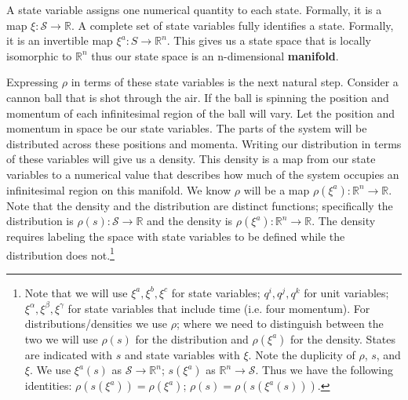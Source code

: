 \documentclass{article}
\begin{document}
\begin{defn}
	A state variable assigns one numerical quantity to each state. Formally, it is a map $\xi : \mathcal{S} \to \mathbb{R}$. A complete set of state variables fully identifies a state. Formally, it is an invertible  map $\xi^a : S \rightarrow \mathbb{R}^n $. This gives us a state space that is locally isomorphic to $\mathbb{R}^n$ thus our state space is an n-dimensional \textbf{manifold}.
\end{defn}

		
	Expressing $\rho$ in terms of these state variables is the next natural step. Consider a cannon ball that is shot through the air. If the ball is spinning the position and momentum of each infinitesimal region of the ball will vary. Let the position and momentum in space be our state variables. The parts of the system will be distributed across these positions and momenta. Writing our distribution in terms of these variables will give us a density. This density is a map from our state variables to a numerical value that describes how much of the system occupies an infinitesimal region on this manifold. We know $\rho$ will be a map $\rho(\xi^a): \mathbb{R}^n \to \mathbb{R}$. Note that the density and the distribution are distinct functions; specifically the distribution is $\rho(s) : \mathcal{S} \to \mathbb{R}$ and the density is $\rho(\xi^a) : \mathbb{R}^n \to \mathbb{R}$. The density requires labeling the space with state variables to be defined while the distribution does not.\footnote{Note that we will use $\xi^a, \xi^b, \xi^c$ for state variables; $q^i, q^j, q^k$ for unit variables; $\xi^\alpha, \xi^\beta, \xi^\gamma$ for state variables that include time (i.e. four momentum). For distributions/densities we use $\rho$; where we need to distinguish between the two we will use $\rho(s)$ for the distribution and $\rho(\xi^a)$ for the density. States are indicated with $s$ and state variables with $\xi$. Note the duplicity of $\rho$, $s$, and $\xi$. We use $\xi^a(s)$ as $\mathcal{S} \to \mathbb{R}^n$; $s(\xi^a)$ as $\mathbb{R}^n \to \mathcal{S}$.
Thus we have the following identities: $\rho(s(\xi^a)) = \rho(\xi^a)$; $\rho(s) = \rho(s (\xi^a(s)))$.}

\end{document}
